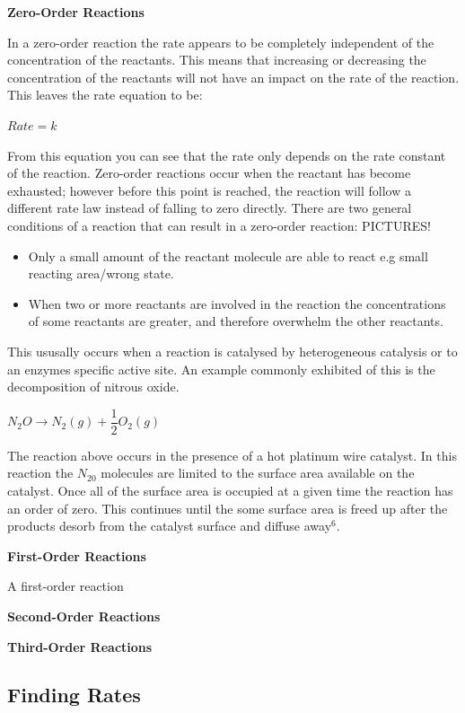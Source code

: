 \textbf{Zero-Order Reactions}

In a zero-order reaction the rate appears to be completely independent of the concentration of the reactants. This means that increasing or decreasing the concentration of the reactants will not have an impact on the rate of the reaction. This leaves the rate equation to be:

$Rate = k$

From this equation you can see that the rate only depends on the rate constant of the reaction. Zero-order reactions occur when the reactant has become exhausted; however before this point is reached, the reaction will follow a different rate law instead of falling to zero directly. There are two general conditions of a reaction that can result in a zero-order reaction:
PICTURES!
\begin{itemize}
\item Only a small amount of the reactant molecule are able to react e.g small reacting area/wrong state.
\item When two or more reactants are involved in the reaction the concentrations of some reactants are greater, and therefore overwhelm the other reactants.
\end{itemize}

This ususally occurs when a reaction is catalysed by heterogeneous catalysis or to an enzymes specific active site. An example commonly exhibited of this is the decomposition of nitrous oxide.

$N_2O \rightarrow N_2(g) + \dfrac{1}{2} O_2(g)$

The reaction above occurs in the presence of a hot platinum wire catalyst. In this reaction the $N_20$ molecules are limited to the surface area available on the catalyst. Once all of the surface area is occupied at a given time the reaction has an order of zero. This continues until the some surface area is freed up after the products desorb from the catalyst surface and diffuse away$^6$.

\textbf{First-Order Reactions}

A first-order reaction 

\textbf{Second-Order Reactions}

\textbf{Third-Order Reactions} 




	\subsection{Finding Rates}


